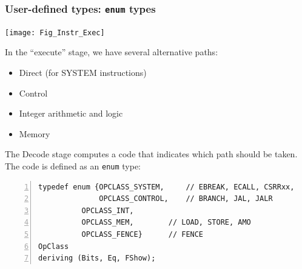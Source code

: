 \begin{frame}[fragile]
\frametitle{User-defined types: {\tt enum} types}

\footnotesize

\begin{center}
 \begin{minipage}{0.55\textwidth}
  \texttt{[image: Fig\_Instr\_Exec]}
 \end{minipage}
 \hm
 \begin{minipage}{0.33\textwidth}
  In the ``execute'' stage, we have several alternative paths:
  \begin{itemize}
   \item Direct (for SYSTEM instructions)
   \item Control
   \item Integer arithmetic and logic
   \item Memory
  \end{itemize}
 \end{minipage}
\end{center}

\vspace{2ex}

The Decode stage computes a code that indicates which path should be taken. \\
The code is defined as an {\tt enum} type:

\begin{Verbatim}[frame=single, numbers=left]
typedef enum {OPCLASS_SYSTEM,     // EBREAK, ECALL, CSRRxx,
              OPCLASS_CONTROL,    // BRANCH, JAL, JALR
	      OPCLASS_INT,
	      OPCLASS_MEM,        // LOAD, STORE, AMO
	      OPCLASS_FENCE}      // FENCE
OpClass
deriving (Bits, Eq, FShow);
\end{Verbatim}

\end{frame}


